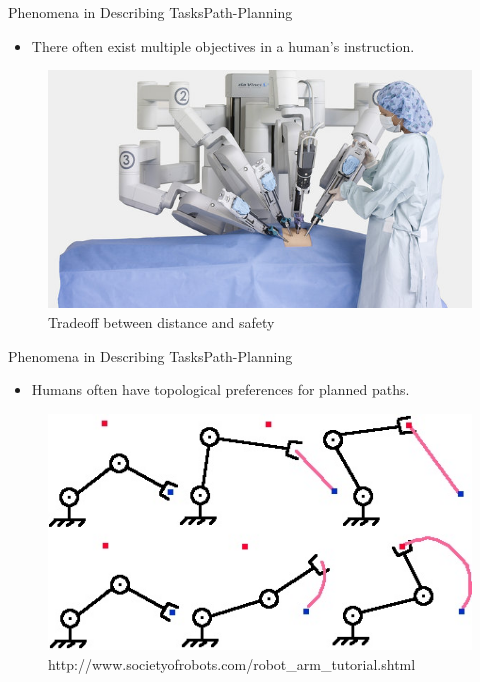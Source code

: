 \begin{frame}{Phenomena in Describing Tasks}{Path-Planning}

\begin{block}{}
\begin{itemize}
\item There often exist multiple objectives in a human's instruction.\footnotemark
\end{itemize}
\end{block}

\begin{figure}
	\centering
	\includegraphics[width=.6\linewidth]{figure/surgery_robot}
	\caption{Tradeoff between distance and safety\footnotemark}
\end{figure}



\end{frame}

\begin{frame}{Phenomena in Describing Tasks}{Path-Planning}

\begin{block}{}
\begin{itemize}
\item Humans often have topological preferences for planned paths.\footnotemark
\end{itemize}
\end{block}

\begin{figure}
	\centering
	\includegraphics[width=.5\linewidth]{figure/robot_arm_path}
	\caption{\tiny http://www.societyofrobots.com/robot\_arm\_tutorial.shtml}
\end{figure}


\end{frame}

